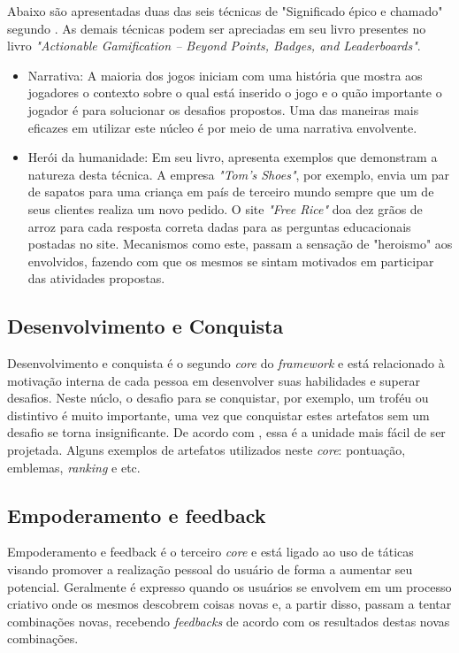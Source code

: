 Abaixo são apresentadas duas das seis técnicas de "Significado épico e chamado" segundo .
As demais técnicas podem ser apreciadas em seu livro presentes no livro \textit{"Actionable Gamification – Beyond Points, Badges, and Leaderboards"}.

\begin{itemize}
	\item Narrativa: A maioria dos jogos iniciam com uma história que mostra aos jogadores o contexto sobre o qual está
	inserido o jogo e o quão importante o jogador é para solucionar os desafios propostos. Uma das maneiras mais eficazes
	em utilizar este núcleo é por meio de uma narrativa envolvente. 
	\item Herói da humanidade: Em seu livro,  apresenta exemplos que demonstram a natureza desta
	técnica. A empresa \textit{"Tom's Shoes"}, por exemplo, envia um par de sapatos para uma criança em país de terceiro mundo sempre
	que um de seus clientes realiza um novo pedido. O site \textit{"Free Rice"} doa dez grãos de arroz para cada resposta correta dadas
	para as perguntas educacionais postadas no site. Mecanismos como este, passam a sensação de "heroismo" aos envolvidos, fazendo com que 
	os mesmos se sintam motivados em participar das atividades propostas.  

\end{itemize}

\subsection{Desenvolvimento e Conquista}
Desenvolvimento e conquista é o segundo \textit{core} do \textit{framework} e está relacionado à motivação interna de 
cada pessoa em desenvolver suas habilidades e superar desafios. Neste núclo, o desafio para se conquistar, por exemplo, 
um troféu ou distintivo é muito importante, uma vez que conquistar estes artefatos sem um desafio se torna insignificante.
De acordo com , essa é a unidade mais fácil de ser projetada. Alguns exemplos de artefatos utilizados
neste \textit{core}: pontuação, emblemas, \textit{ranking} e etc.

\subsection{Empoderamento e feedback}
Empoderamento e feedback é o terceiro \textit{core} e está ligado ao uso de táticas visando promover a realização pessoal
do usuário de forma a aumentar seu potencial. Geralmente é expresso quando os usuários se envolvem em um processo criativo
onde os mesmos descobrem coisas novas e, a partir disso, passam a tentar combinações novas, recebendo \textit{feedbacks}
de acordo com os resultados destas novas combinações.

